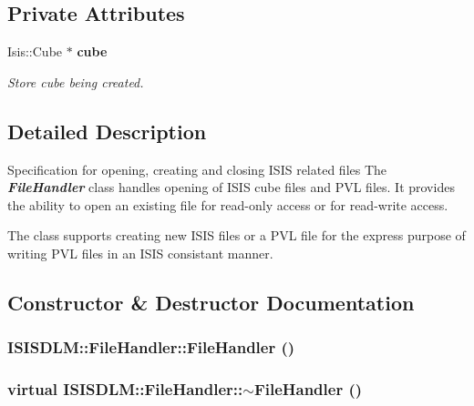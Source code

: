\subsection*{Private Attributes}
\begin{CompactItemize}
\item 
Isis::Cube $\ast$ {\bf cube}
\begin{CompactList}\small\item\em Store cube being created. \item\end{CompactList}\end{CompactItemize}


\subsection{Detailed Description}
Specification for opening, creating and closing ISIS related files The {\em {\bf File\-Handler}\/} class handles opening of ISIS cube files and PVL files. It provides the ability to open an existing file for read-only access or for read-write access.

The class supports creating new ISIS files or a PVL file for the express purpose of writing PVL files in an ISIS consistant manner. 



\subsection{Constructor \& Destructor Documentation}
\subsubsection{\setlength{\rightskip}{0pt plus 5cm}ISISDLM::File\-Handler::File\-Handler ()\hspace{0.3cm}{\tt  [inline]}}\label{classISISDLM_1_1FileHandler_a0}


\subsubsection{\setlength{\rightskip}{0pt plus 5cm}virtual ISISDLM::File\-Handler::$\sim${\bf File\-Handler} ()\hspace{0.3cm}{\tt  [inline, virtual]}}\label{classISISDLM_1_1FileHandler_a1}




